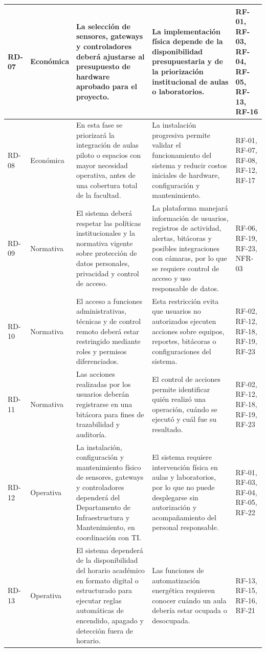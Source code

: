 \begin{longtable}{|p{3.1cm}|p{3.1cm}|p{3.1cm}|p{3.1cm}|p{3.1cm}|}
RD-07 & Económica & La selección de sensores, gateways y controladores deberá ajustarse al presupuesto de hardware aprobado para el proyecto. & La implementación física depende de la disponibilidad presupuestaria y de la priorización institucional de aulas o laboratorios. & RF-01, RF-03, RF-04, RF-05, RF-13, RF-16 \\ \hline
RD-08 & Económica & En esta fase se priorizará la integración de aulas piloto o espacios con mayor necesidad operativa, antes de una cobertura total de la facultad. & La instalación progresiva permite validar el funcionamiento del sistema y reducir costos iniciales de hardware, configuración y mantenimiento. & RF-01, RF-07, RF-08, RF-12, RF-17 \\ \hline
RD-09 & Normativa & El sistema deberá respetar las políticas institucionales y la normativa vigente sobre protección de datos personales, privacidad y control de acceso. & La plataforma manejará información de usuarios, registros de actividad, alertas, bitácoras y posibles integraciones con cámaras, por lo que se requiere control de acceso y uso responsable de datos. & RF-06, RF-19, RF-23, NFR-03 \\ \hline
RD-10 & Normativa & El acceso a funciones administrativas, técnicas y de control remoto deberá estar restringido mediante roles y permisos diferenciados. & Esta restricción evita que usuarios no autorizados ejecuten acciones sobre equipos, reportes, bitácoras o configuraciones del sistema. & RF-02, RF-12, RF-18, RF-19, RF-23 \\ \hline
RD-11 & Normativa & Las acciones realizadas por los usuarios deberán registrarse en una bitácora para fines de trazabilidad y auditoría. & El control de acciones permite identificar quién realizó una operación, cuándo se ejecutó y cuál fue su resultado. & RF-02, RF-12, RF-18, RF-19, RF-23 \\ \hline
RD-12 & Operativa & La instalación, configuración y mantenimiento físico de sensores, gateways y controladores dependerá del Departamento de Infraestructura y Mantenimiento, en coordinación con TI. & El sistema requiere intervención física en aulas y laboratorios, por lo que no puede desplegarse sin autorización y acompañamiento del personal responsable. & RF-01, RF-03, RF-04, RF-05, RF-22 \\ \hline
RD-13 & Operativa & El sistema dependerá de la disponibilidad del horario académico en formato digital o estructurado para ejecutar reglas automáticas de encendido, apagado y detección fuera de horario. & Las funciones de automatización energética requieren conocer cuándo un aula debería estar ocupada o desocupada. & RF-13, RF-15, RF-16, RF-21 \\ \hline

\end{longtable}

